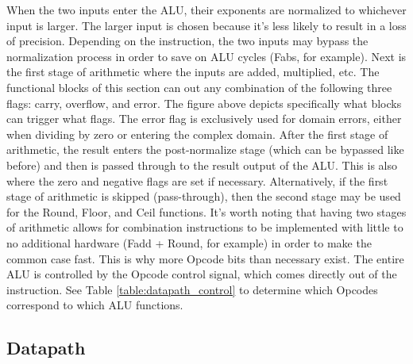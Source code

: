 \documentclass[letter,14pt]{article}
\begin{document}
\noindent
When the two inputs enter the ALU, their exponents are normalized to whichever input is larger. The larger input is chosen because it’s less likely to result in a loss of precision. Depending on the instruction, the two inputs may bypass the normalization process in order to save on ALU cycles (Fabs, for example).
\noindent\newline\newline
Next is the first stage of arithmetic where the inputs are added, multiplied, etc. The functional blocks of this section can out any combination of the following three flags: carry, overflow, and error. The figure above depicts specifically what blocks can trigger what flags. The error flag is exclusively used for domain errors, either when dividing by zero or entering the complex domain.
 \noindent\newline\newline
After the first stage of arithmetic, the result enters the post-normalize stage (which can be bypassed like before) and then is passed through to the result output of the ALU. This is also where the zero and negative flags are set if necessary. Alternatively, if the first stage of arithmetic is skipped (pass-through), then the second stage may be used for the Round, Floor, and Ceil functions. It's worth noting that having two stages of arithmetic allows for combination instructions to be implemented with little to no additional hardware (Fadd + Round, for example) in order to make the common case fast. This is why more Opcode bits than necessary exist.
 \noindent\newline\newline
The entire ALU is controlled by the Opcode control signal, which comes directly out of the instruction. See Table \ref{table:datapath_control} to determine which Opcodes correspond to which ALU functions.


\subsection{Datapath}
\end{document}
